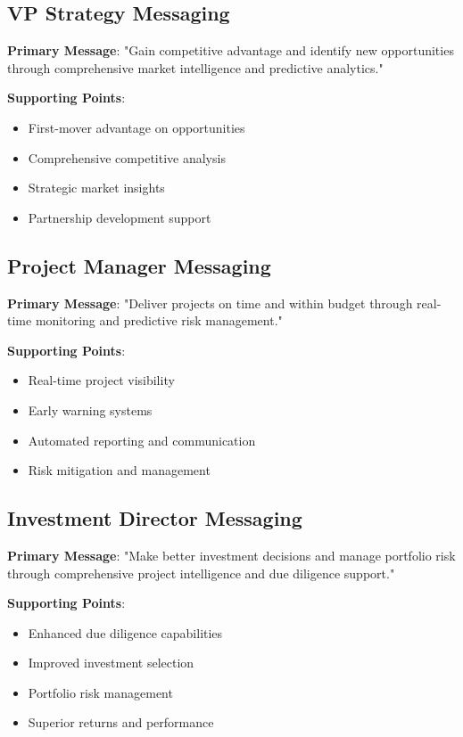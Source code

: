 \documentclass[business]{../templates/infraradar-main}
\begin{document}
\subsection{VP Strategy Messaging}
\textbf{Primary Message}: "Gain competitive advantage and identify new opportunities through comprehensive market intelligence and predictive analytics."

\textbf{Supporting Points}:
\begin{itemize}
    \item First-mover advantage on opportunities
    \item Comprehensive competitive analysis
    \item Strategic market insights
    \item Partnership development support
\end{itemize}

\subsection{Project Manager Messaging}
\textbf{Primary Message}: "Deliver projects on time and within budget through real-time monitoring and predictive risk management."

\textbf{Supporting Points}:
\begin{itemize}
    \item Real-time project visibility
    \item Early warning systems
    \item Automated reporting and communication
    \item Risk mitigation and management
\end{itemize}

\subsection{Investment Director Messaging}
\textbf{Primary Message}: "Make better investment decisions and manage portfolio risk through comprehensive project intelligence and due diligence support."

\textbf{Supporting Points}:
\begin{itemize}
    \item Enhanced due diligence capabilities
    \item Improved investment selection
    \item Portfolio risk management
    \item Superior returns and performance
\end{itemize}
\end{document}
